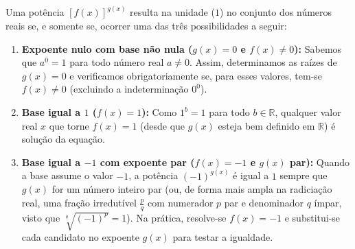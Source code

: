 \documentclass[12pt,a4paper]{report}
\begin{document}
	\begin{destaque}[{Caso II: Equações da forma $[f(x)]^{g(x)} = 1$}]
		Uma potência $[f(x)]^{g(x)}$ resulta na unidade ($1$) no conjunto dos números reais se, e somente se, ocorrer uma das três possibilidades a seguir:
		\begin{enumerate}
			\item \textbf{Expoente nulo com base não nula ($g(x) = 0$ e $f(x) \neq 0$):}
			Sabemos que $a^0 = 1$ para todo número real $a \neq 0$. Assim, determinamos as raízes de $g(x) = 0$ e verificamos obrigatoriamente se, para esses valores, tem-se $f(x) \neq 0$ (excluindo a indeterminação $0^0$).
			\item \textbf{Base igual a $1$ ($f(x) = 1$):}
			Como $1^b = 1$ para todo $b \in \mathbb{R}$, qualquer valor real $x$ que torne $f(x) = 1$ (desde que $g(x)$ esteja bem definido em $\mathbb{R}$) é solução da equação.
			\item \textbf{Base igual a $-1$ com expoente par ($f(x) = -1$ e $g(x)$ par):}
			Quando a base assume o valor $-1$, a potência $(-1)^{g(x)}$ é igual a $1$ sempre que $g(x)$ for um número inteiro par (ou, de forma mais ampla na radiciação real, uma fração irredutível $\frac{p}{q}$ com numerador $p$ par e denominador $q$ ímpar, visto que $\sqrt[q]{(-1)^p} = 1$). Na prática, resolve-se $f(x) = -1$ e substitui-se cada candidato no expoente $g(x)$ para testar a igualdade.
		\end{enumerate}
	\end{destaque}
	
	\vspace{0.3cm}
	
\end{document}
